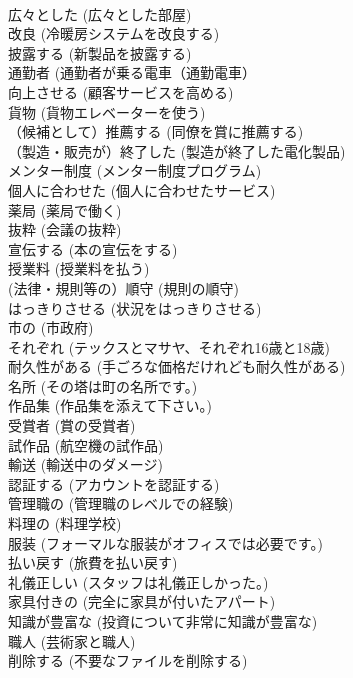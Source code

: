 \documentclass[8pt]{extreport}
\begin{document}
\begin{CJK}{UTF8}{min}
\\	広々とした	(広々とした部屋)		
\\	改良	(冷暖房システムを改良する)		
\\	披露する	(新製品を披露する)		
\\	通勤者	(通勤者が乗る電車（通勤電車）		
\\	向上させる	(顧客サービスを高める)		
\\	貨物	(貨物エレベーターを使う)		
\\	（候補として）推薦する	(同僚を賞に推薦する)		
\\	（製造・販売が）終了した	(製造が終了した電化製品)		
\\	メンター制度	(メンター制度プログラム)		
\\	個人に合わせた	(個人に合わせたサービス)		
\\	薬局	(薬局で働く)		
\\	抜粋	(会議の抜粋)		
\\	宣伝する	(本の宣伝をする)		
\\	授業料	(授業料を払う)		
\\	(法律・規則等の）順守	(規則の順守)		
\\	はっきりさせる	(状況をはっきりさせる)		
\\	市の	(市政府)		
\\	それぞれ	(テックスとマサヤ、それぞれ16歳と18歳)		
\\	耐久性がある	(手ごろな価格だけれども耐久性がある)		
\\	名所	(その塔は町の名所です。)		
\\	作品集	(作品集を添えて下さい。)		
\\	受賞者	(賞の受賞者)		
\\	試作品	(航空機の試作品)		
\\	輸送	(輸送中のダメージ)		
\\	認証する	(アカウントを認証する)		
\\	管理職の	(管理職のレベルでの経験)		
\\	料理の	(料理学校)		
\\	服装	(フォーマルな服装がオフィスでは必要です。)		
\\	払い戻す	(旅費を払い戻す)		
\\	礼儀正しい	(スタッフは礼儀正しかった。)		
\\	家具付きの	(完全に家具が付いたアパート)		
\\	知識が豊富な	(投資について非常に知識が豊富な)		
\\	職人	(芸術家と職人)		
\\	削除する	(不要なファイルを削除する)		

\end{CJK}
\end{document}
